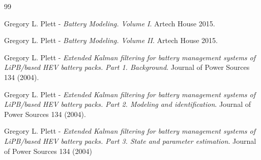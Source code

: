 \documentclass[12pt,a4paper]{scrartcl}
\begin{document}
\begin{thebibliography}{99}

	 Gregory L. Plett - \textit{Battery Modeling. Volume I}. Artech House 2015.
	
	 Gregory L. Plett - \textit{Battery Modeling. Volume II}. Artech House 2015.
	
	 Gregory L. Plett - \textit{Extended Kalman filtering for battery management systems of LiPB/based HEV battery packs. Part 1. Background}. Journal of Power Sources 134 (2004).
	
	 Gregory L. Plett - \textit{Extended Kalman filtering for battery management systems of LiPB/based HEV battery packs. Part 2. Modeling and identification}. Journal of Power Sources 134 (2004).	
	
	 Gregory L. Plett - \textit{Extended Kalman filtering for battery management systems of LiPB/based HEV battery packs. Part 3. State and parameter estimation}. Journal of Power Sources 134 (2004)
	
\end{thebibliography}
\end{document}
